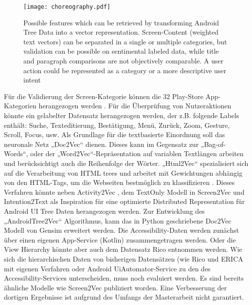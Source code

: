 \begin{figure}
  \centering
  \texttt{[image: choreography.pdf]}
  \caption{Possible features which can be retrieved by transforming Android Tree Data into a vector representation. Screen-Content (weighted text vectors) can be separated in a single or multiple categories, but validation can be possible on sentimental labeled data, while title and paragraph comparisons are not objectively comparable. A user action could be represented as a category or a more descriptive user intent}
  \label{fig:encode-decode}
\end{figure}

Für die Validierung der Screen-Kategorie können die 32 Play-Store App-Kategorien herangezogen werden \cite{google2023appCategory}. Für die Überprüfung von Nutzeraktionen könnte ein gelabelter Datensatz herangezogen werden, der z.B. folgende Labels enthält: Suche, Texteditierung, Bestätigung, Menü, Zurück, Zoom, Gesture, Scroll, Focus, usw.
Als Grundlage für die textbasierte Einordnung soll das neuronale Netz „Doc2Vec“ \cite{wu2022distributed} dienen. Dieses kann im Gegensatz zur „Bag-of-Words“, oder der „Word2Vec“-Repräsentation auf variablen Textlängen arbeiten und berücksichtigt auch die Reihenfolge der Wörter. „Html2Vec“ spezialisiert sich auf die Verarbeitung von HTML trees und arbeitet mit Gewichtungen abhängig von den HTML-Tags, um die Webseiten bestmöglich zu klassifizieren \cite{wu2022distributed}. Dieses Verfahren könnte neben Activity2Vec \cite{ghods2019activity2vec}, dem TextOnly Modell in Screen2Vec \cite{li2021screen2vec} und Intention2Text \cite{yu2020understanding} als Inspiration für eine optimierte Distributed Representation für Android UI Tree Daten herangezogen werden.
Zur Entwicklung des „AndroidTree2Vec“ Algorithmus, kann das in Python geschriebene Doc2Vec Modell von Gensim \cite{rare2023gensim} erweitert werden. Die Accessibility-Daten werden zunächst über einen eigenen App-Service (Kotlin) zusammengetragen werden. Oder die View Hierarchy könnte aber auch dem Datensatz Rico \cite{deka2017rico} entnommen werden. Wie sich die hierarchischen Daten von bisherigen Datensätzen (wie Rico und ERICA \cite{deka2016erica} mit eigenen Verfahren oder Android UiAutomator-Service \cite{google2023uiAutomator} zu den des Accessibility-Services unterscheiden, muss noch evaluiert werden. 
Es sind bereits ähnliche Modelle wie Screen2Vec \cite{li2021screen2vec} publiziert worden. Eine Verbesserung der dortigen Ergebnisse ist aufgrund des Umfangs der Masterarbeit nicht garantiert.
